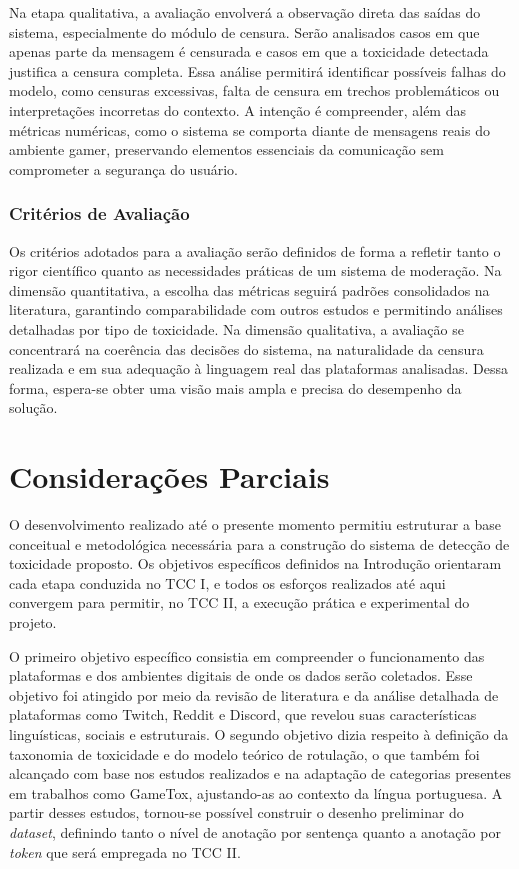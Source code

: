 \documentclass{eic-bcc-tcc}
\begin{document}
Na etapa qualitativa, a avaliação envolverá a observação direta das saídas do sistema, especialmente do módulo de censura. Serão analisados casos em que apenas parte da mensagem é censurada e casos em que a toxicidade detectada justifica a censura completa. Essa análise permitirá identificar possíveis falhas do modelo, como censuras excessivas, falta de censura em trechos problemáticos ou interpretações incorretas do contexto. A intenção é compreender, além das métricas numéricas, como o sistema se comporta diante de mensagens reais do ambiente gamer, preservando elementos essenciais da comunicação sem comprometer a segurança do usuário.

\subsection{Critérios de Avaliação}

Os critérios adotados para a avaliação serão definidos de forma a refletir tanto o rigor científico quanto as necessidades práticas de um sistema de moderação. Na dimensão quantitativa, a escolha das métricas seguirá padrões consolidados na literatura, garantindo comparabilidade com outros estudos e permitindo análises detalhadas por tipo de toxicidade. Na dimensão qualitativa, a avaliação se concentrará na coerência das decisões do sistema, na naturalidade da censura realizada e em sua adequação à linguagem real das plataformas analisadas. Dessa forma, espera-se obter uma visão mais ampla e precisa do desempenho da solução.


\chapter{Considerações Parciais}

O desenvolvimento realizado até o presente momento permitiu estruturar a base conceitual e metodológica necessária para a construção do sistema de detecção de toxicidade proposto. Os objetivos específicos definidos na Introdução orientaram cada etapa conduzida no TCC I, e todos os esforços realizados até aqui convergem para permitir, no TCC II, a execução prática e experimental do projeto.

O primeiro objetivo específico consistia em compreender o funcionamento das plataformas e dos ambientes digitais de onde os dados serão coletados. Esse objetivo foi atingido por meio da revisão de literatura e da análise detalhada de plataformas como Twitch, Reddit e Discord, que revelou suas características linguísticas, sociais e estruturais. O segundo objetivo dizia respeito à definição da taxonomia de toxicidade e do modelo teórico de rotulação, o que também foi alcançado com base nos estudos realizados e na adaptação de categorias presentes em trabalhos como GameTox, ajustando-as ao contexto da língua portuguesa. A partir desses estudos, tornou-se possível construir o desenho preliminar do \textit{dataset}, definindo tanto o nível de anotação por sentença quanto a anotação por \textit{token} que será empregada no TCC II.
\end{document}
